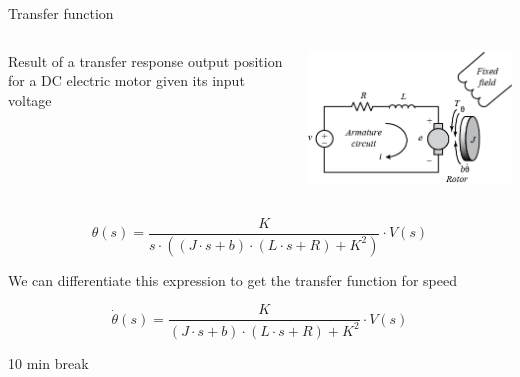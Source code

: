 \documentclass[compress]{beamer}
\makeatletter
\let\beamer@writeslidentry@miniframeson=\beamer@writeslidentry
\def\beamer@writeslidentry@miniframesoff{%
  \expandafter\beamer@ifempty\expandafter{\beamer@framestartpage}{}%
  {%
    \clearpage\beamer@notesactions%
  }
}
\newcommand*{\miniframeson}{\let\beamer@writeslidentry=\beamer@writeslidentry@miniframeson}
\newcommand*{\miniframesoff}{\let\beamer@writeslidentry=\beamer@writeslidentry@miniframesoff}
\makeatother
\begin{document}
\begin{frame}{Transfer function}

    \begin{columns}
        \begin{column}{0.5\linewidth}

            Result of a transfer response output position for a DC electric motor
            given its input voltage

        \end{column}
        \begin{column}{0.5\linewidth}


            \begin{center}
                \includegraphics[width=0.9\columnwidth]{image63}
            \end{center}

        \end{column}
    \end{columns}

\[
    \theta(s) = \frac{K}{s \cdot ( (J \cdot s + b) \cdot (L \cdot s+ R) + K^2)} \cdot V(s)
\]

\pause

We can differentiate this expression to get the transfer function for speed

\[
    \dot\theta(s) = \frac{K}{(J \cdot s + b) \cdot (L \cdot s + R) + K^2} \cdot V(s)
\]


\end{frame}

\miniframesoff
\begin{frame}[plain]
    \begin{center}
        \Large
        10 min break\\[2em]
    \end{center}
\end{frame}
\miniframeson
\end{document}
